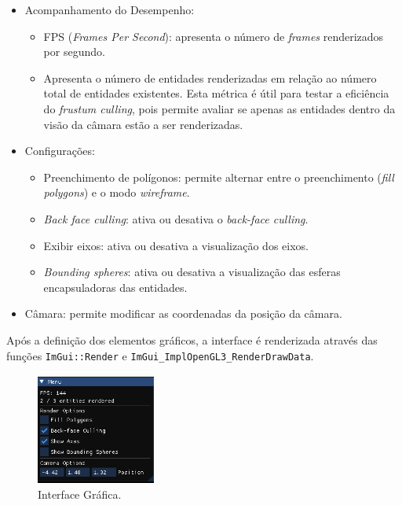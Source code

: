 \documentclass[12pt, a4paper]{article}
\begin{document}
\begin{itemize}
    \item Acompanhamento do Desempenho:
    \begin{itemize}
        \item FPS (\textit{Frames Per Second}): apresenta o número de \textit{frames}
        renderizados por segundo.
        \item Apresenta o número de entidades renderizadas em relação ao número total de entidades
        existentes. Esta métrica é útil para testar a eficiência do \textit{frustum culling},
        pois permite avaliar se apenas as entidades dentro da visão da câmara estão a ser
        renderizadas.
    \end{itemize}
    \item Configurações:
    \begin{itemize}
        \item Preenchimento de polígonos: permite alternar entre o preenchimento
        (\textit{fill polygons}) e o modo \textit{wireframe}.
        \item \textit{Back face culling}: ativa ou desativa o \textit{back-face culling}.
        \item Exibir eixos: ativa ou desativa a visualização dos eixos.
        \item \textit{Bounding spheres}: ativa ou desativa a visualização das esferas encapsuladoras
        das entidades.
    \end{itemize}
    \item Câmara: permite modificar as coordenadas da posição da câmara.
\end{itemize}

Após a definição dos elementos gráficos, a interface é renderizada através das funções
\texttt{ImGui::Render} e \texttt{ImGui\_ImplOpenGL3\_RenderDrawData}.

\begin{figure}[H]
    \centering
    \includegraphics[width=0.35\textwidth]{res/phase2/UI.png}
    \caption{Interface Gráfica.}
\end{figure}
\end{document}
